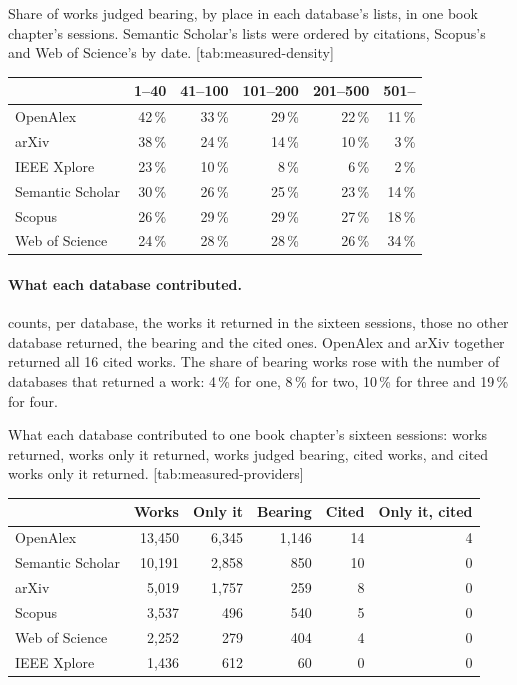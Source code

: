 \begin{table}
  \begin{sidecaption}{%
      Share of works judged bearing, by place in each database's lists,
      in one book chapter's sessions.
      Semantic Scholar's lists were ordered by citations, Scopus's and
      Web of Science's by date.
    }[tab:measured-density]
    \begin{tabular}{@{}lrrrrr@{}}
      \toprule
      & 1--40 & 41--100 & 101--200 & 201--500 & 501-- \\
      \midrule
      OpenAlex & 42\,\% & 33\,\% & 29\,\% & 22\,\% & 11\,\% \\
      arXiv & 38\,\% & 24\,\% & 14\,\% & 10\,\% & 3\,\% \\
      IEEE Xplore & 23\,\% & 10\,\% & 8\,\% & 6\,\% & 2\,\% \\
      Semantic Scholar & 30\,\% & 26\,\% & 25\,\% & 23\,\% & 14\,\% \\
      Scopus & 26\,\% & 29\,\% & 29\,\% & 27\,\% & 18\,\% \\
      Web of Science & 24\,\% & 28\,\% & 28\,\% & 26\,\% & 34\,\% \\
      \bottomrule
    \end{tabular}
  \end{sidecaption}
\end{table}

\paragraph{What each database contributed.}
 counts, per database, the works it
returned in the sixteen sessions, those no other database returned, the
bearing and the cited ones.
OpenAlex and arXiv together returned all 16 cited works.
The share of bearing works rose with the number of databases that
returned a work: 4\,\% for one, 8\,\% for two, 10\,\% for three and
19\,\% for four.

\begin{table}
  \begin{sidecaption}{%
      What each database contributed to one book chapter's sixteen
      sessions: works returned, works only it returned, works judged
      bearing, cited works, and cited works only it returned.
    }[tab:measured-providers]
    \begin{tabular}{@{}lrrrrr@{}}
      \toprule
      & Works & Only it & Bearing & Cited & Only it, cited \\
      \midrule
      OpenAlex & 13,450 & 6,345 & 1,146 & 14 & 4 \\
      Semantic Scholar & 10,191 & 2,858 & 850 & 10 & 0 \\
      arXiv & 5,019 & 1,757 & 259 & 8 & 0 \\
      Scopus & 3,537 & 496 & 540 & 5 & 0 \\
      Web of Science & 2,252 & 279 & 404 & 4 & 0 \\
      IEEE Xplore & 1,436 & 612 & 60 & 0 & 0 \\
      \bottomrule
    \end{tabular}
  \end{sidecaption}
\end{table}

